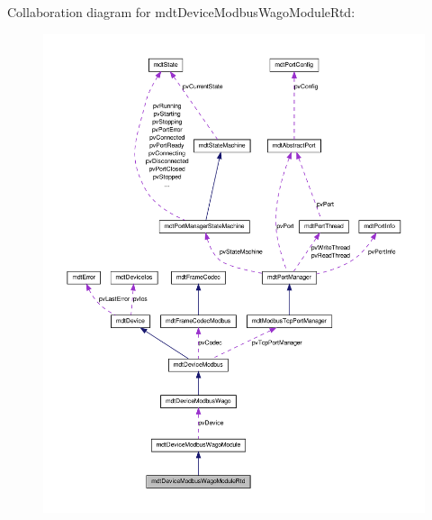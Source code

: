 Collaboration diagram for mdtDeviceModbusWagoModuleRtd:
\nopagebreak
\begin{figure}[H]
\begin{center}
\leavevmode
\includegraphics[width=400pt]{classmdt_device_modbus_wago_module_rtd__coll__graph}
\end{center}
\end{figure}
